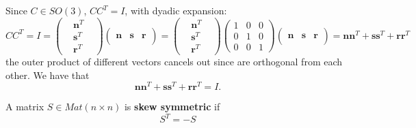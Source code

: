 \documentclass[10pt, letterpaper]{report}
\begin{document}
Since $C\in SO(3)$, $CC^T=I$, with dyadic expansion:\begin{equation}
    CC^T=I= \begin{pmatrix}
        
        &\mathbf n^T&\\ &\mathbf s^T& \\&\mathbf r^T&
        
    \end{pmatrix}
    \begin{pmatrix}
        &&\\
        \mathbf n&\mathbf s&\mathbf r\\
        &&
    \end{pmatrix}= \begin{pmatrix}
        
        &\mathbf n^T&\\ &\mathbf s^T& \\&\mathbf r^T&
        
    \end{pmatrix}\begin{pmatrix}
        1&0&0\\ 
        0&1&0\\ 
        0&0&1
    \end{pmatrix}
    \begin{pmatrix}
        &&\\
        \mathbf n&\mathbf s&\mathbf r\\
        &&
    \end{pmatrix}=\mathbf n\mathbf n^T+
    \mathbf s\mathbf s^T+
    \mathbf r\mathbf r^T
\end{equation} 
the outer product of different vectors cancels out since are orthogonal from each other. We have that\begin{equation}
    \mathbf n\mathbf n^T+
    \mathbf s\mathbf s^T+
    \mathbf r\mathbf r^T=I.
\end{equation}
\begin{definition}
    A matrix $S\in Mat(n\times n)$ is \textbf{skew symmetric} if\begin{equation}
        S^T=-S
    \end{equation}
\end{definition}
\end{document}
